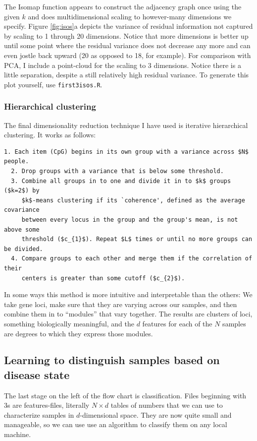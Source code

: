 \documentclass[]{article}
\begin{document}
  The Isomap function appears to construct the adjacency graph once using the given $k$ and does multidimensional scaling to however-many dimensions we specify. Figure \ref{fig:isos}a depicts the variance of residual information not captured by scaling to 1 through 20 dimensions. Notice that more dimensions is better up until some point where the residual variance does not decrease any more and can even jostle back upward (20 as opposed to 18, for example). For comparison with PCA, I include a point-cloud for the scaling to 3 dimensions. Notice there is a little separation, despite a still relatively high residual variance. To generate this plot yourself, use \texttt{first3isos.R}.

  \subsubsection{Hierarchical clustering}

  The final dimensionality reduction technique I have used is iterative hierarchical clustering. It works as follows:

  \begin{lstlisting}[mathescape]
  1. Each item (CpG) begins in its own group with a variance across $N$ people.
  2. Drop groups with a variance that is below some threshold.
  3. Combine all groups in to one and divide it in to $k$ groups ($k=2$) by
     $k$-means clustering if its `coherence', defined as the average covariance
     between every locus in the group and the group's mean, is not above some
     threshold ($c_{1}$). Repeat $L$ times or until no more groups can be divided.
  4. Compare groups to each other and merge them if the correlation of their
     centers is greater than some cutoff ($c_{2}$).
  \end{lstlisting}

  In some ways this method is more intuitive and interpretable than the others: We take gene loci, make sure that they are varying across our samples, and then combine them in to ``modules'' that vary together. The results are clusters of loci, something biologically meaningful, and the $d$ features for each of the $N$ samples are degrees to which they express those modules.

  \subsection{Learning to distinguish samples based on disease state}

  The last stage on the left of the flow chart is classification. Files beginning with 3s are features-files, literally $N \times d$ tables of numbers that we can use to characterize samples in $d$-dimensional space. They are now quite small and manageable, so we can use use an algorithm to classify them on any local machine.
\end{document}
